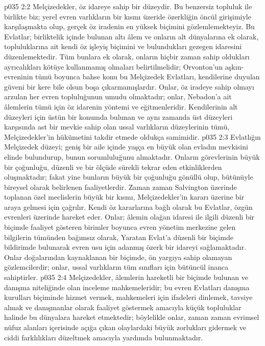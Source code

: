 \vs p035 2:2 Melçizedekler, öz idareye sahip bir düzeydir. Bu benzersiz topluluk ile birlikte biz; yerel evren varlıkların bir kısmı üzeride özerkliğin öncül girişimiyle karşılaşmakta olup, gerçek öz iradenin en yüksek biçimini gözlemlemekteyiz. Bu Evlatlar; birliktelik içinde bulunan altı âlem ve onların alt dünyalarına ek olarak, topluluklarına ait kendi öz işleyiş biçimini ve bulundukları gezegen idaresini düzenlemektedir. Tüm bunlara ek olarak, onların hiçbir zaman sahip oldukları ayrıcalıkları kötüye kullanmamış olmaları belirtilmelidir; Orvonton’un aşkın\hyp{}evreninin tümü boyunca bahse konu bu Melçizedek Evlatları, kendilerine duyulan güveni bir kere bile olsun boşa çıkarmamışlardır. Onlar, öz iradeye sahip olmayı arzulan her evren topluluğunun umudu olmaktadır; onlar, Nebadon’a ait âlemlerin tümü için öz idarenin yöntemi ve eğitmenleridir. Kendilerinin alt düzeyleri için üstün bir konumda bulunan ve aynı zamanda üst düzeyleri karşısında ast bir mevkie sahip olan ussal varlıkların düzeylerinin tümü, Melçizedekler’in hükümetini takdir etmede oldukça samimidir.
\vs p035 2:3 Evlatlığın Melçizedek düzeyi; geniş bir aile içinde yaşça en büyük olan evladın mevkisini elinde bulundurup, bunun sorumluluğunu almaktadır. Onların görevlerinin büyük bir çoğunluğu, düzenli ve bir ölçüde sürekli tekrar eden etkinliklerden oluşmaktadır; fakat yine bunların büyük bir çoğunluğu gönüllü olup, bütünüyle bireysel olarak belirlenen faaliyetlerdir. Zaman zaman Salvington üzerinde toplanan özel meclislerin büyük bir kısmı, Melçizedekler’in kararı üzerine bir araya gelmesi için çağrılır. Kendi öz kararlarına bağlı olarak bu Evlatlar, özgün evrenleri üzerinde hareket eder. Onlar; âlemin olağan idaresi ile ilgili düzenli bir biçimde faaliyet gösteren birimler boyunca evren yönetim merkezine gelen bilgilerin tümünden bağımsız olarak, Yaratan Evlat’a düzenli bir biçimde bildirimde bulunarak evren usu için adanmış özerk bir idareyi sağlamaktadır. Onlar doğalarından kaynaklanan bir biçimde, ön yargıya sahip olamayan gözlemcilerdir; onlar, ussal varlıkların tüm sınıfları için bütüncül inanca sahiptirler.
\vs p035 2:4 Melçizedekler, âlemlerin hareketli bir biçimde bulunan ve danışma niteliğinde olan inceleme mahkemeleridir; bu evren Evlatları danışma kurulları biçiminde hizmet vermek, mahkemeleri için ifadeleri dinlemek, tavsiye almak ve danışmanlar olarak faaliyet göstermek amacıyla küçük topluluklar halinde bu dünyalara hareket etmektedir; böylelikle onlar, zaman zaman evrimsel nüfuz alanları içerisinde açığa çıkan olaylardaki büyük zorlukları gidermek ve ciddi farklılıkları düzeltmek amacıyla yardımda bulunmaktadır.
